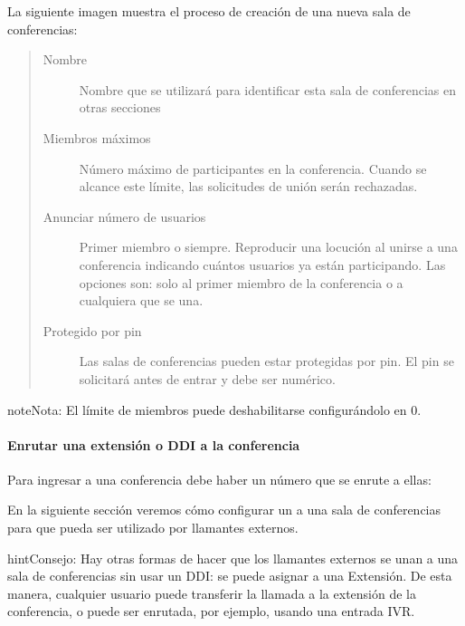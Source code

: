\documentclass[letterpaper,10pt,spanish]{sphinxmanual}
\begin{document}
La siguiente imagen muestra el proceso de creación de una nueva sala de conferencias:
\begin{quote}
\begin{description}
\item[{Nombre}] \leavevmode
Nombre que se utilizará para identificar esta sala de conferencias en otras secciones

\item[{Miembros máximos}] \leavevmode
Número máximo de participantes en la conferencia. Cuando se alcance este límite, las solicitudes de unión serán rechazadas.

\item[{Anunciar número de usuarios}] \leavevmode
Primer miembro o siempre. Reproducir una locución al unirse a una conferencia indicando cuántos usuarios ya están participando. Las opciones son: solo al primer miembro de la conferencia o a cualquiera que se una.

\item[{Protegido por pin}] \leavevmode
Las salas de conferencias pueden estar protegidas por pin. El pin se solicitará antes de entrar y debe ser numérico.

\end{description}
\end{quote}

\begin{notice}{note}{Nota:}
El límite de miembros puede deshabilitarse configurándolo en 0.
\end{notice}
\paragraph{Enrutar una extensión o DDI a la conferencia}

Para ingresar a una conferencia debe haber un número que se enrute a ellas:

En la siguiente sección veremos cómo configurar un {\hyperref[administration_portal/brand/views/ddis:ddis]{}} a una sala de conferencias para que pueda ser utilizado por llamantes externos.

\begin{notice}{hint}{Consejo:}
Hay otras formas de hacer que los llamantes externos se unan a una sala de conferencias sin usar un DDI: se puede asignar a una Extensión. De esta manera, cualquier usuario puede transferir la llamada a la extensión de la conferencia, o puede ser enrutada, por ejemplo, usando una entrada IVR.
\end{notice}
\end{document}
